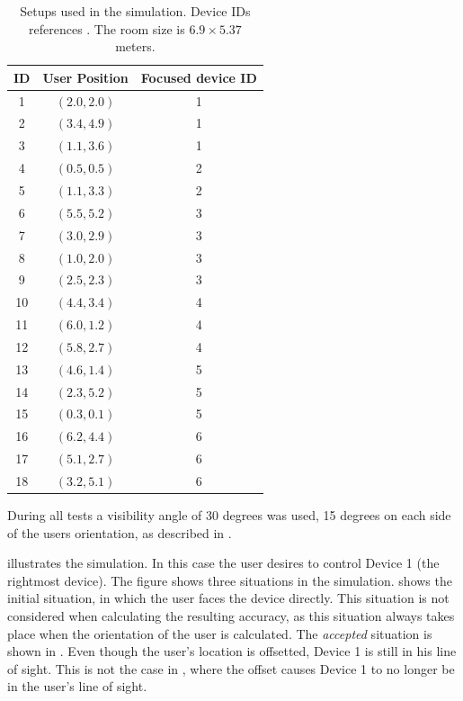\begin{table}[!hbt]
\centering
\begin{tabular}{c|cc}
	ID & User Position & Focused device ID \\ \hline
	1  & $(2.0 , 2.0)$ &         1         \\
	2  & $(3.4 , 4.9)$ &         1         \\
	3  & $(1.1 , 3.6)$ &         1         \\
	4  & $(0.5 , 0.5)$ &         2         \\
	5  & $(1.1 , 3.3)$ &         2         \\
	6  & $(5.5 , 5.2)$ &         3         \\
	7  & $(3.0 , 2.9)$ &         3         \\
	8  & $(1.0 , 2.0)$ &         3         \\
	9  & $(2.5 , 2.3)$ &         3         \\
	10 & $(4.4 , 3.4)$ &         4         \\
	11 & $(6.0 , 1.2)$ &         4         \\
	12 & $(5.8 , 2.7)$ &         4         \\
	13 & $(4.6 , 1.4)$ &         5         \\
	14 & $(2.3 , 5.2)$ &         5         \\
	15 & $(0.3 , 0.1)$ &         5         \\
	16 & $(6.2 , 4.4)$ &         6         \\
	17 & $(5.1 , 2.7)$ &         6         \\
	18 & $(3.2 , 5.1)$ &         6
\end{tabular}
\caption{Setups used in the simulation. Device IDs references . The room size is $6.9 \times 5.37$ meters.}
\label{lst:evaluation:system-correctness:setups}
\end{table}

During all tests a visibility angle of \num{30} degrees was used, 
\ie \num{15} degrees on each side of the users orientation, 
as described in .

 illustrates the simulation. 
In this case the user desires to control Device 1 (the rightmost device). 
The figure shows three situations in the simulation. 
 shows the initial situation, 
in which the user faces the device directly. 
This situation is not considered when calculating the resulting accuracy, 
as this situation always takes place when the orientation of the user is calculated. 
The \emph{accepted} situation is shown in . 
Even though the user's location is offsetted, 
Device 1 is still in his line of sight. 
This is not the case in , 
where the offset causes Device 1 to no longer be in the user's line of sight.

